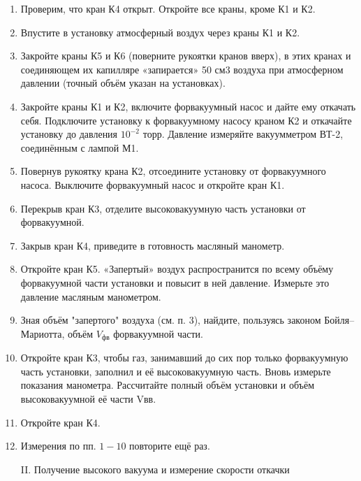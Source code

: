 \documentclass[a4paper,12pt]{article} %
\begin{document}
\begin{enumerate}
  \item Проверим, что кран К4 открыт. Откройте все краны, кроме К1 и К2.
  \item Впустите в установку атмосферный воздух через краны К1 и К2.
  \item Закройте краны К5 и К6 (поверните рукоятки кранов вверх), в этих кранах и соединяющем их капилляре «запирается» 50 см3 воздуха при атмосферном давлении (точный объём указан на установках).
  \item Закройте краны К1 и К2, включите форвакуумный насос и дайте ему откачать себя. Подключите установку к форвакуумному насосу краном К2 и откачайте установку до давления $10^{-2}$ торр. Давление измеряйте вакуумметром ВТ-2, соединённым с лампой М1.
  \item Повернув рукоятку крана К2, отсоедините установку от форвакуумного насоса. Выключите форвакуумный насос и откройте кран К1.
  \item Перекрыв кран К3, отделите высоковакуумную часть установки от форвакуумной.
  \item Закрыв кран К4, приведите в готовность масляный манометр.
  \item Откройте кран К5. «Запертый» воздух распространится по всему объёму форвакуумной части установки и повысит в ней давление. Измерьте это давление масляным манометром.
  \item Зная объём "запертого" воздуха (см. п. 3), найдите, пользуясь законом Бойля–Мариотта, объём $V_{\text{фв}}$ форвакуумной части.
  \item Откройте кран К3, чтобы газ, занимавший до сих пор только форвакуумную часть установки, заполнил и её высоковакуумную часть. Вновь измерьте показания манометра. Рассчитайте полный объём установки и объём высоковакуумной её части Vвв.
  \item Откройте кран К4.
  \item Измерения по пп. $1-10$ повторите ещё раз.

\begin{center}
  \textsf{II. Получение высокого вакуума и измерение скорости откачки}
\end{center}


\end{enumerate}
\end{document}
